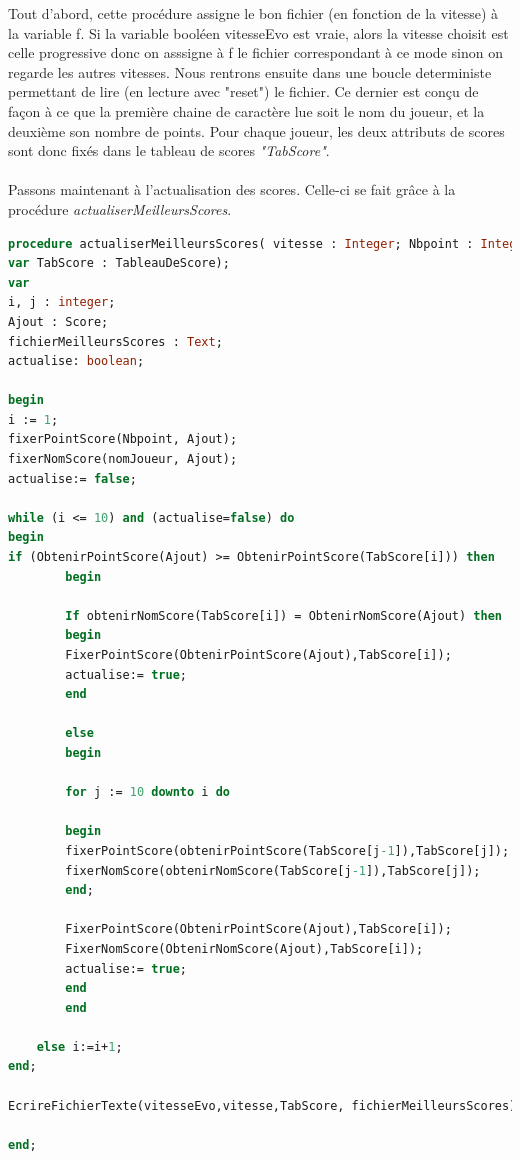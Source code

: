 \documentclass[11pt,a4paper]{article}
\begin{document}
\normalsize
Tout d'abord, cette procédure assigne le bon fichier (en fonction de la vitesse) à la variable f. Si la variable booléen vitesseEvo est vraie, alors la vitesse choisit est celle progressive donc on asssigne à f le fichier correspondant à ce mode sinon on regarde les autres vitesses. Nous rentrons ensuite dans une boucle deterministe permettant de lire (en lecture avec "reset") le fichier. Ce dernier est conçu de façon à ce que la première chaine de caractère lue soit le nom du joueur, et la deuxième son nombre de points. Pour chaque joueur, les deux attributs de scores sont donc fixés dans le tableau de scores \textit{"TabScore"}.\\\\
Passons maintenant à l'actualisation des scores. Celle-ci se fait grâce à la procédure \textit{actualiserMeilleursScores}.
\scriptsize
\begin{lstlisting}[language=Pascal,frame=single,caption=Code source de la procédure acualiserMeilleursScores]
procedure actualiserMeilleursScores( vitesse : Integer; Nbpoint : Integer; nomJoueur : String;) 
var TabScore : TableauDeScore);
var 
i, j : integer;
Ajout : Score;
fichierMeilleursScores : Text;
actualise: boolean;

begin
i := 1;
fixerPointScore(Nbpoint, Ajout);
fixerNomScore(nomJoueur, Ajout);
actualise:= false;

while (i <= 10) and (actualise=false) do
begin
if (ObtenirPointScore(Ajout) >= ObtenirPointScore(TabScore[i])) then 
        begin
        
        If obtenirNomScore(TabScore[i]) = ObtenirNomScore(Ajout) then
        begin
        FixerPointScore(ObtenirPointScore(Ajout),TabScore[i]);
        actualise:= true;
        end
        
        else
        begin
        
        for j := 10 downto i do    
        
		begin
		fixerPointScore(obtenirPointScore(TabScore[j-1]),TabScore[j]); 
        fixerNomScore(obtenirNomScore(TabScore[j-1]),TabScore[j]); 
        end;
            
        FixerPointScore(ObtenirPointScore(Ajout),TabScore[i]);
        FixerNomScore(ObtenirNomScore(Ajout),TabScore[i]);
        actualise:= true;
        end
        end
        
	else i:=i+1;
end;

EcrireFichierTexte(vitesseEvo,vitesse,TabScore, fichierMeilleursScores);

end;
\end{lstlisting}
\normalsize
\end{document}
